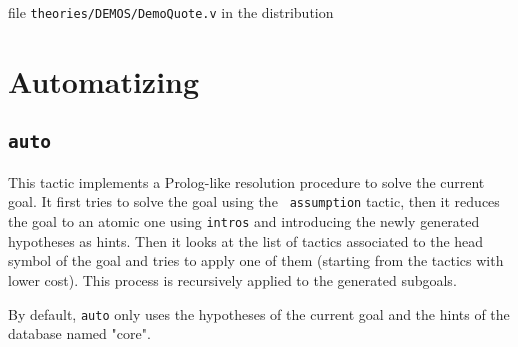 \SeeAlso file \texttt{theories/DEMOS/DemoQuote.v} in the distribution

\section{Automatizing}
\label{Automatizing}

\subsection{\tt auto}
This tactic implements a Prolog-like resolution procedure to solve the
current goal. It first tries to solve the goal using the {\tt
  assumption} tactic, then it reduces the goal to an atomic one using
{\tt intros} and introducing the newly generated hypotheses as hints.
Then it looks at the list of tactics associated to the head symbol of
the goal and tries to apply one of them (starting from the tactics
with lower cost). This process is recursively applied to the generated
subgoals. 

By default, \texttt{auto} only uses the hypotheses of the current goal and the
hints of the database named "core". 


